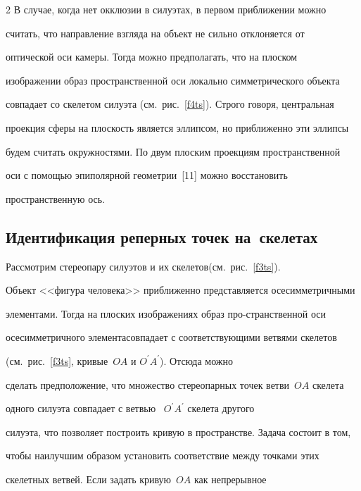 \begin{multicols}{2}
     В случае, когда нет окклюзии в силуэтах, в первом приближении можно 

считать, что направление взгляда на объект не сильно отклоняется от 

оптической оси камеры. Тогда можно предполагать, что на плоском 

изображении образ пространственной оси локально симметрического объекта 

совпадает со скелетом силуэта (см.\ рис.~\ref{f4ts}). Строго говоря, центральная 

проекция сферы на плоскость является эллипсом, но приближенно эти эллипсы 

будем считать окружностями. По двум плоским проекциям пространственной 

оси с помощью эпиполярной геометрии~[11] можно восстановить 

пространственную ось.

     





\subsection{Идентификация реперных точек на~скелетах} %

     

     Рассмотрим стереопару силуэтов и их скелетов\linebreak (см.\  рис.~\ref{f3ts}). 

Объект <<фигура человека>> прибли\-женно представляется осесимметричными 

элементами. Тогда на плоских изображениях образ про-\linebreak странственной оси 

осесимметричного элемента\linebreak совпадает с соответствующими ветвями скелетов 

(см.\ рис.~\ref{f3ts}, кривые~$OA$ и $O^\prime A^\prime$). Отсюда можно 

сделать предположение, что множество стереопарных точек ветви~$OA$ скелета 

одного силуэта совпадает с ветвью~ $O^\prime A^\prime$ скелета другого 

силуэта, что позволяет построить кривую в пространстве. Задача состоит в том, 

чтобы наилучшим образом установить соответствие между точками этих 

скелетных ветвей. Если задать кривую~$OA$ как непрерывное 


\end{multicols}
